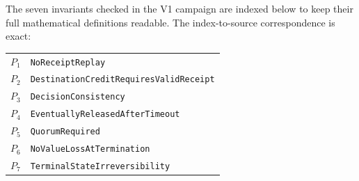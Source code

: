 The seven invariants checked in the V1 campaign are indexed below to
keep their full mathematical definitions readable. The index-to-source
correspondence is exact:
\begin{center}
\small
\begin{tabular}{ll}
$P_1$ & \texttt{NoReceiptReplay} \\
$P_2$ & \texttt{DestinationCreditRequiresValidReceipt} \\
$P_3$ & \texttt{DecisionConsistency} \\
$P_4$ & \texttt{EventuallyReleasedAfterTimeout} \\
$P_5$ & \texttt{QuorumRequired} \\
$P_6$ & \texttt{NoValueLossAtTermination} \\
$P_7$ & \texttt{TerminalStateIrreversibility}
\end{tabular}
\end{center}

